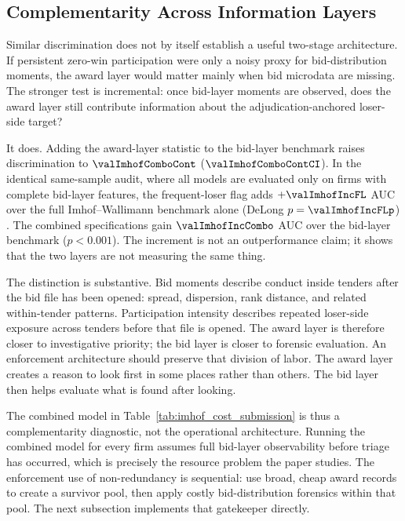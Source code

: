 \subsection{Complementarity Across Information Layers}
\label{sec:complementary_signals}

Similar discrimination does not by itself establish a useful
two-stage architecture. If persistent zero-win participation were
only a noisy proxy for bid-distribution moments, the award layer
would matter mainly when bid microdata are missing. The stronger
test is incremental: once bid-layer moments are observed, does
the award layer still contribute information about the
adjudication-anchored loser-side target?

It does. Adding the award-layer statistic to the bid-layer
benchmark raises discrimination to $\valImhofComboCont$
($\valImhofComboContCI$). In the identical same-sample audit,
where all models are evaluated only on firms with complete
bid-layer features, the frequent-loser flag adds
$+\valImhofIncFL$ AUC over the full Imhof--Wallimann benchmark
alone (DeLong $p=\valImhofIncFLp$) \citep{delong1988comparing}.
The combined specifications
gain $\valImhofIncCombo$ AUC over the bid-layer benchmark
($p<0.001$). The increment is not an outperformance claim; it
shows that the two layers are not measuring the same thing.

The distinction is substantive. Bid moments describe conduct
inside tenders after the bid file has been opened: spread,
dispersion, rank distance, and related within-tender patterns.
Participation intensity describes repeated loser-side exposure
across tenders before that file is opened. The award layer is
therefore closer to investigative priority; the bid layer is
closer to forensic evaluation. An enforcement architecture
should preserve that division of labor. The award layer creates a
reason to look first in some places rather than others. The bid
layer then helps evaluate what is found after looking.

The combined model in Table~\ref{tab:imhof_cost_submission} is thus a
complementarity diagnostic, not the operational architecture.
Running the combined model for every firm assumes full
bid-layer observability before triage has occurred, which is
precisely the resource problem the paper studies. The enforcement
use of non-redundancy is sequential: use broad, cheap award
records to create a survivor pool, then apply costly
bid-distribution forensics within that pool. The next subsection
implements that gatekeeper directly.

